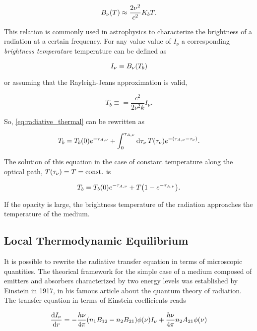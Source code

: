 \begin{equation}
        B_\nu\qty(T) \approx \frac{2\nu^2}{c^2} K_b T.
\end{equation}

This relation is commonly used in astrophysics to characterize the
brightness of a radiation at a certain frequency. For any value value of
$I_\nu$ a corresponding \emph{brightness temperature} temperature can be
defined as

\begin{equation}
        I_\nu \equiv B_\nu\qty(T_b)
\end{equation}

or assuming that the Rayleigh-Jeans approximation is valid,

\begin{equation}
        T_b \equiv = \frac{c^2}{2\nu^2k} I_\nu.
\end{equation}

So, \autoref{eq:radiative_thermal} can be rewritten as

\begin{equation}
        T_b = T_b\qty(0) e^{-\tau_{A,\nu}} +
        \int^{\tau_{A,\nu}}_0 \dd{\tau_\nu} T\qty(\tau_\nu)
        e^{-\qty(\tau_{A,\nu} - \tau_\nu)}.
\end{equation}

The solution of this equation in the case of constant temperature along the
optical path, $T\qty(\tau_\nu) = T = \text{const.}$ is

\begin{equation}
        T_b = T_b\qty(0) e^{-\tau_{A,\nu}} + T\qty(1 -
        e^{-\tau_{A,\nu}}).
\end{equation}

If the opacity is large, the brightness temperature of the radiation
approaches the temperature of the medium.

\subsection{Local Thermodynamic Equilibrium}

It is possible to rewrite the radiative transfer equation in terms of
microscopic quantities. The theorical framework for the simple case of a
medium composed of emitters and absorbers characterized by two energy
levels was established by Einstein in
1917, in his famous article about the quantum theory of radiation.
The transfer equation in terms of Einstein coefficients reads

\begin{equation}
        \dv{I_\nu}{r} = -\frac{h\nu}{4\pi}\qty(n_1 B_{12} -
        n_2 B_{21})\phi\qty(\nu)I_\nu +
        \frac{h\nu}{4\pi} n_2 A_{21}\phi\qty(\nu)
\end{equation}

